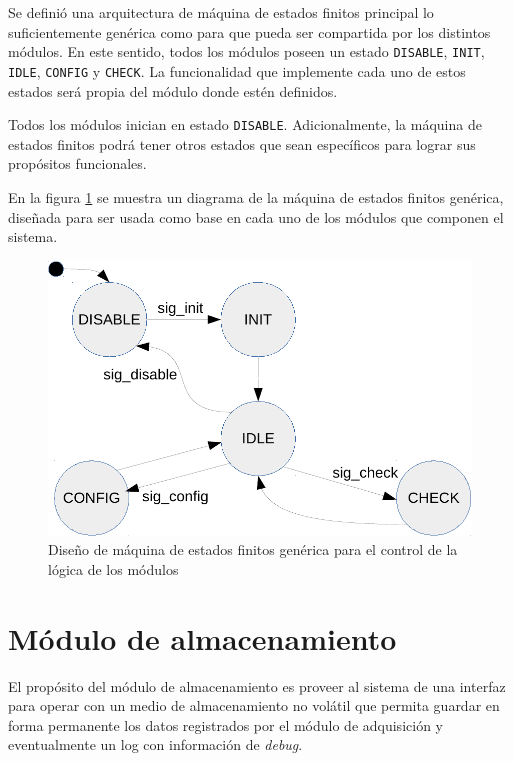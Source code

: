 Se definió una arquitectura de máquina de estados finitos principal lo suficientemente genérica como para que pueda ser compartida por los distintos módulos.  En este sentido, todos los módulos poseen un estado \texttt{DISABLE}, \texttt{INIT}, \texttt{IDLE}, \texttt{CONFIG} y \texttt{CHECK}. La funcionalidad que implemente cada uno de estos estados será propia del módulo donde estén definidos.

Todos los módulos inician en estado \texttt{DISABLE}. Adicionalmente, la máquina de estados finitos podrá tener otros estados que sean específicos para lograr sus propósitos funcionales.

En la figura \ref{fig:mef_generica} se muestra un diagrama de la máquina de estados finitos genérica, diseñada para ser usada como base en cada uno de los módulos que componen el sistema.

\begin{figure}[htpb]
	\centering
	\includegraphics[width=\textwidth]{./Figures/MEF_generica.pdf}
	\caption[Diseño de MEF genérica para los módulos]{Diseño de máquina de estados finitos genérica para el control de la lógica de los módulos}
	\label{fig:mef_generica}
\end{figure}

\section{Módulo de almacenamiento}
\label{sec:almacenamiento}

El propósito del módulo de almacenamiento es proveer al sistema de una interfaz para operar con un medio de almacenamiento no volátil que permita guardar en forma permanente los datos registrados por el módulo de adquisición y eventualmente un log con información de \textit{debug}.

